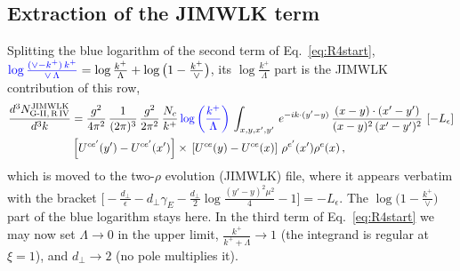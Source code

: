 \documentclass[9pt]{article}
\numberwithin{equation}{section}
\begin{document}
\subsection{Extraction of the JIMWLK term}
Splitting the blue logarithm of the second term of Eq.~\eqref{eq:R4start},
${\color{blue}\log\frac{(\vee-k^{+})\,k^{+}}{\vee\,\Lambda}}=\log\frac{k^{+}}{\Lambda}+\log\big(1-\frac{k^{+}}{\vee}\big)$,
its $\log\frac{k^{+}}{\Lambda}$ part is the JIMWLK contribution of this row,
\begin{align}
    \frac{d^{3}N^{\rm JIMWLK}_{\rm G\text{-}II,\,R\,IV}}{d^{3}k} & =  \frac{g^{2}}{4\pi^{2}}\, \frac{1}{(2\pi)^{3}}\,\frac{g^{2}}{2\pi^{2}}\, \frac{N_{c}}{k^{+}}\,{\color{blue}\log{\left(\frac{k^{+}}{\Lambda}\right)}}\,\int_{x,y,x',y'}\,e^{-ik\cdot (y'-y)}\,\frac{(x-y)\cdot (x'-y')}{(x-y)^{2}\,(x'-y')^{2}}\,\left[-L_{\epsilon}\right]\notag \\ & \left[U^{ce'}(y') - U^{ce'}(x')\right] \times\, \left[U^{ce}(y) - U^{ce}(x)\right]\, \rho^{e'}(x') \rho^{e}(x)\,,
\end{align}
which is moved to the two-$\rho$ evolution (JIMWLK) file, where it appears verbatim with the bracket
$\big[-\frac{d_{\perp}}{\epsilon}-d_{\perp}\gamma_{E}-\frac{d_{\perp}}{2}\log\frac{(y'-y)^{2}\mu^{2}}{4}-1\big]=-L_{\epsilon}$.
The $\log\big(1-\frac{k^{+}}{\vee}\big)$ part of the blue logarithm stays here. In the third term of
Eq.~\eqref{eq:R4start} we may now set $\Lambda\to0$ in the upper limit, $\frac{k^{+}}{k^{+}+\Lambda}\to1$
(the integrand is regular at $\xi=1$), and $d_{\perp}\to2$ (no pole multiplies it).
\end{document}
